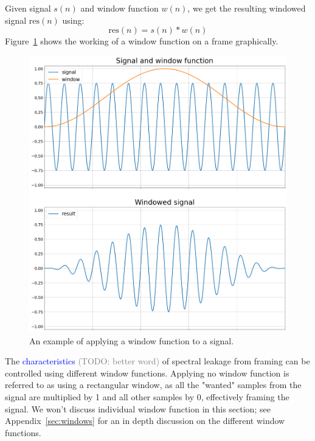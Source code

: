 \documentclass[10pt,twocolumn]{article}
\begin{document}
Given signal $s(n)$ and window function $w(n)$, we get the resulting windowed signal $\text{res}(n)$ using:
\[ \text{res}(n) = s(n) * w(n) \]
Figure~\ref{fig:windowfunc} shows the working of a window function on a frame graphically.
\begin{figure}[h]
    \centering
    \includegraphics[width=\linewidth]{fig/window.png}
    \caption{An example of applying a window function to a signal.}
    \label{fig:windowfunc}
\end{figure}

The \textcolor{blue}{characteristics} \textcolor{gray}{(TODO: better word)} of spectral leakage from framing can be controlled using different window functions.
Applying no window function is referred to as using a rectangular window, as all the "wanted" samples from the signal are multiplied by 1 and all other samples by 0, effectively framing the signal. We won't discuss individual window function in this section; see Appendix~\ref{sec:windows} for an in depth discussion on the different window functions.
\end{document}
